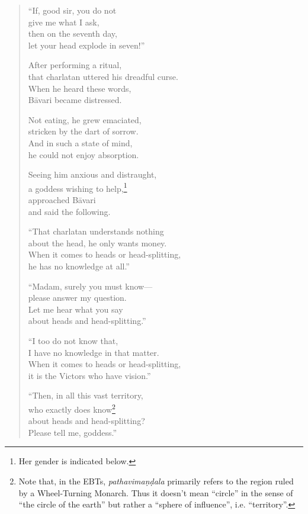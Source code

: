\documentclass[12pt,openany]{book}%
\begin{document}
\begin{verse}
“If, good sir, you do not \\
give me what I ask, \\
then on the seventh day, \\
let your head explode in seven!” 

After performing a ritual, \\
that charlatan uttered his dreadful curse. \\
When he heard these words, \\
\textsanskrit{Bāvari} became distressed. 

Not eating, he grew emaciated, \\
stricken by the dart of sorrow. \\
And in such a state of mind, \\
he could not enjoy absorption. 

Seeing him anxious and distraught, \\
a goddess wishing to help,\footnote{Her gender is indicated below. } \\
approached \textsanskrit{Bāvari} \\
and said the following. 

“That charlatan understands nothing \\
about the head, he only wants money. \\
When it comes to heads or head-splitting, \\
he has no knowledge at all.” 

“Madam, surely you must know—\\
please answer my question. \\
Let me hear what you say \\
about heads and head-splitting.” 

“I too do not know that, \\
I have no knowledge in that matter. \\
When it comes to heads or head-splitting, \\
it is the Victors who have vision.” 

“Then, in all this vast territory, \\
who exactly does know\footnote{Note that, in the EBTs, \textit{\textsanskrit{pathavimaṇḍala}} primarily refers to the region ruled by a Wheel-Turning Monarch. Thus it doesn’t mean “circle” in the sense of “the circle of the earth” but rather a “sphere of influence”, i.e. “territory”. } \\
about heads and head-splitting? \\
Please tell me, goddess.” 


\end{verse}
\end{document}
